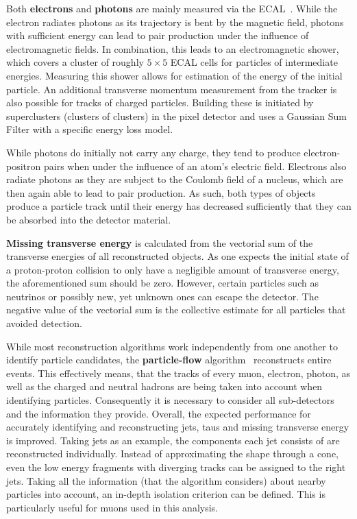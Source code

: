 Both \textbf{electrons} and \textbf{photons} are mainly measured via the ECAL~\cite{elereco}. While the electron radiates photons as its trajectory is bent by the magnetic field, photons with sufficient energy can lead to pair production under the influence of electromagnetic fields. In combination, this leads to an electromagnetic shower, which covers a cluster of roughly $5 \times 5$ ECAL cells for particles of intermediate energies. Measuring this shower allows for estimation of the energy of the initial particle. An additional transverse momentum measurement from the tracker is also possible for tracks of charged particles. Building these is initiated by superclusters (clusters of clusters) in the pixel detector and uses a Gaussian Sum Filter with a specific energy loss model.

While photons do initially not carry any charge, they tend to produce electron-positron pairs when under the influence of an atom's electric field. Electrons also radiate photons as they are subject to the Coulomb field of a nucleus, which are then again able to lead to pair production. As such, both types of objects produce a particle track until their energy has decreased sufficiently that they can be absorbed into the detector material.

\textbf{Missing transverse energy} is calculated from the vectorial sum of the transverse energies of all reconstructed objects. As one expects the initial state of a proton-proton collision to only have a negligible amount of transverse energy, the aforementioned sum should be zero. However, certain particles such as neutrinos or possibly new, yet unknown ones can escape the detector. The negative value of the vectorial sum is the collective estimate for all particles that avoided detection.

While most reconstruction algorithms work independently from one another to identify particle candidates, the \textbf{particle-flow} algorithm~\cite{pflow} reconstructs entire events. This effectively means, that the tracks of every muon, electron, photon, as well as the charged and neutral hadrons are being taken into account when identifying particles. Consequently it is necessary to consider all sub-detectors and the information they provide. Overall, the expected performance for accurately identifying and reconstructing jets, taus and missing transverse energy is improved. Taking jets as an example, the components each jet consists of are reconstructed individually. Instead of approximating the shape through a cone, even the low energy fragments with diverging tracks can be assigned to the right jets. Taking all the information (that the algorithm considers) about nearby particles into account, an in-depth isolation criterion can be defined. This is particularly useful for muons used in this analysis.



